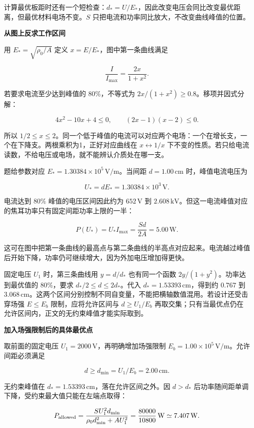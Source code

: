 \documentclass[12pt,a4paper,UTF8]{ctexart}
\begin{document}
计算最优板距时还有一个短检查：\(d_*=U/E_*\)，因此改变电压会同比改变最优距离，但最优材料电场不变。\(S\)
只把电流和功率同比放大，不改变曲线峰值的位置。

\textbf{从图上反求工作区间}

用 \(E_* =\sqrt{\rho_0/A}\) 定义 \(x=E/E_*\)，图中第一条曲线满足

\[\frac I{I_{\max}}=\frac{2x}{1+x^2}.\]

若要求电流至少达到峰值的 \(80\%\)，不等式为
\(2x/(1+x^2)\ge0.8\)。移项并因式分解：

\[4x^2-10x+4\le0,\qquad (2x-1)(x-2)\le0.\]

所以
\(1/2\le x\le2\)。同一个低于峰值的电流可以对应两个电场：一个在增长支，一个在下降支。两根乘积为1，正好对应曲线在
\(x\leftrightarrow1/x\)
下不变的性质。若只给电流读数，不给电压或电场，就不能辨认介质处在哪一支。

题给参数对应 \(E_*=1.30384\times10^5\,\mathrm{V/m}\)。当间距
\(d=1.00\,\mathrm{cm}\) 时，峰值电流电压为

\[U_*=dE_*=1.30384\times10^3\,\mathrm V.\]

电流达到 \(80\%\) 峰值的电压区间因此约为 \(652\,\mathrm V\) 到
\(2.608\,\mathrm{kV}\)。但这一电流峰值对应的焦耳功率只有固定间距功率上限的一半：

\[P(U_*)=U_*I_{\max}=\frac{Sd}{2A}=5.00\,\mathrm W.\]

这可在图中把第一条曲线的最高点与第二条曲线的半高点对应起来。电流越过峰值后开始下降，功率仍可继续增大，因为外加电压增加得更快。

固定电压 \(U_1\) 时，第三条曲线用 \(y=d/d_*\) 也有同一个函数
\(2y/(1+y^2)\)。功率达到最优值的 \(80\%\)，要求
\(d_*/2\le d\le2d_*\)。代入 \(d_*=1.53393\,\mathrm{cm}\)，得到约
\(0.767\) 到
\(3.068\,\mathrm{cm}\)。这两个区间分别控制不同自变量，不能把横轴数值混用。若设计还受击穿场强
\(E\le E_b\) 限制，应将允许区间与 \(d\ge U_1/E_b\)
再取交集；只有当最优点仍在允许区间内，正文的无约束峰值才能实际取到。

\textbf{加入场强限制后的具体最优点}

取前面的固定电压 \(U_1=2000\,\mathrm V\)，再明确增加场强限制
\(E_b=1.00\times10^5\,\mathrm{V/m}\)。允许间距必须满足

\[d\ge d_{\min}=U_1/E_b=2.00\,\mathrm{cm}.\]

无约束峰值在 \(d_*=1.53393\,\mathrm{cm}\)，落在允许区间之外。因
\(d>d_*\) 后功率随间距单调下降，受约束最大值只能在左端点取得：

\[P_{\rm allowed}=\frac{SU_1^2d_{\min}}{\rho_0d_{\min}^2+AU_1^2}=\frac{80000}{10800}\,\mathrm W\simeq7.407\,\mathrm W.\]
\end{document}
